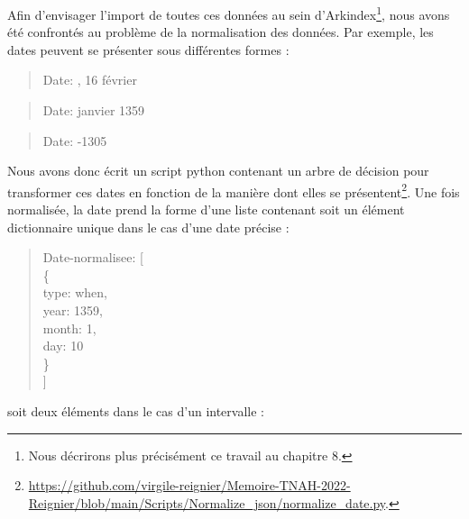 \documentclass[a4paper,12pt,twoside]{book}
\begin{document}
	Afin d'envisager l'import de toutes ces données au sein d'Arkindex\footnote{Nous décrirons plus précisément ce travail au chapitre 8.}, nous avons été confrontés au problème de la normalisation des données. Par exemple, les dates peuvent se présenter sous différentes formes :
	
	\begin{quotation}
		\textquotesingle Date\textquotesingle : , 16 février\textquotesingle 
	\end{quotation}
	
	\begin{quotation}
		\textquotesingle Date\textquotesingle :  janvier 1359\textquotesingle
	\end{quotation}

	\begin{quotation}
		\textquotesingle Date\textquotesingle : -1305\textquotesingle
	\end{quotation}
	
	\noindent Nous avons donc écrit un script python contenant un arbre de décision pour transformer ces dates en fonction de la manière dont elles se présentent\footnote{	\url{https://github.com/virgile-reignier/Memoire-TNAH-2022-Reignier/blob/main/Scripts/Normalize_json/normalize_date.py}.}. Une fois normalisée, la date prend la forme d'une liste contenant soit un élément dictionnaire unique dans le cas d'une date précise :

	\begin{quotation}
		\textquotesingle Date-normalisee\textquotesingle: [\\
		\indent\indent\{\\
		\indent\indent	\textquotesingle type\textquotesingle: \textquotesingle when\textquotesingle,\\
		\indent\indent	\textquotesingle year\textquotesingle: 1359,\\
		\indent\indent	\textquotesingle month\textquotesingle : 1,\\
		\indent\indent	\textquotesingle day\textquotesingle : 10\\
		\indent\indent\}\\
		\indent ]\\
	\end{quotation}

	\pagebreak
	
	\noindent soit deux éléments dans le cas d'un intervalle :
	
\end{document}

